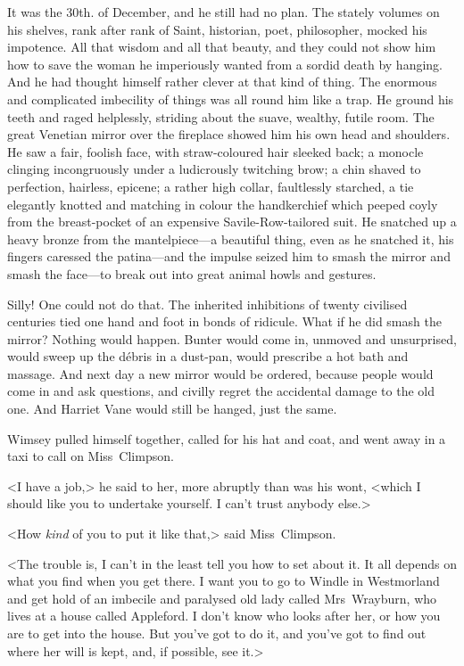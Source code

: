 It was the 30th. of December, and he still had no plan. The stately volumes on his shelves, rank after rank of Saint, historian, poet, philosopher, mocked his impotence. All that wisdom and all that beauty, and they could not show him how to save the woman he imperiously wanted from a sordid death by hanging. And he had thought himself rather clever at that kind of thing. The enormous and complicated imbecility of things was all round him like a trap. He ground his teeth and raged helplessly, striding about the suave, wealthy, futile room. The great Venetian mirror over the fireplace showed him his own head and shoulders. He saw a fair, foolish face, with straw-coloured hair sleeked back; a monocle clinging incongruously under a ludicrously twitching brow; a chin shaved to perfection, hairless, epicene; a rather high collar, faultlessly starched, a tie elegantly knotted and matching in colour the handkerchief which peeped coyly from the breast-pocket of an expensive Savile-Row-tailored suit. He snatched up a heavy bronze from the mantelpiece—a beautiful thing, even as he snatched it, his fingers caressed the patina—and the impulse seized him to smash the mirror and smash the face—to break out into great animal howls and gestures.

Silly! One could not do that. The inherited inhibitions of twenty civilised centuries tied one hand and foot in bonds of ridicule. What if he did smash the mirror? Nothing would happen. Bunter would come in, unmoved and unsurprised, would sweep up the débris in a dust-pan, would prescribe a hot bath and massage. And next day a new mirror would be ordered, because people would come in and ask questions, and civilly regret the accidental damage to the old one. And Harriet Vane would still be hanged, just the same.

Wimsey pulled himself together, called for his hat and coat, and went away in a taxi to call on Miss~Climpson.

<I have a job,> he said to her, more abruptly than was his wont, <which I should like you to undertake yourself. I can't trust anybody else.>

<How \emph{kind} of you to put it like that,> said Miss~Climpson.

<The trouble is, I can't in the least tell you how to set about it. It all depends on what you find when you get there. I want you to go to Windle in Westmorland and get hold of an imbecile and paralysed old lady called Mrs~Wrayburn, who lives at a house called Appleford. I don't know who looks after her, or how you are to get into the house. But you've got to do it, and you've got to find out where her will is kept, and, if possible, see it.>

